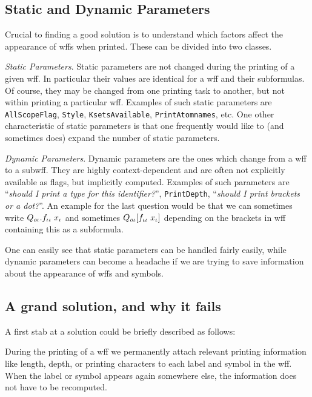 \subsection{Static and Dynamic Parameters}
Crucial to finding a good solution is to understand which factors affect
the appearance of wffs when printed.  These can be divided into two
classes.
\begin{description}
\item {\it Static Parameters}.  Static parameters are not changed during the printing
of a given wff.  In particular their values are identical for a wff
and their subformulas.  Of course, they may be changed from one printing
task to another, but not within printing a particular wff.  Examples
of such static parameters are {\tt AllScopeFlag}, {\tt Style}, {\tt KsetsAvailable},
{\tt PrintAtomnames}, etc.  One other characteristic of static parameters
is that one frequently would like to (and sometimes does) expand the
number of static parameters.

\item {\it Dynamic Parameters}.  Dynamic parameters are the ones which change from
a wff to a subwff.  They are highly context-dependent and are often
not explicitly available as flags, but implicitly computed.  Examples
of such parameters are ``{\it should I print a type for this identifier?}'',
{\tt PrintDepth}, ``{\it should I print brackets or a dot?}''.  An example
for the last question would be that we can sometimes write
$Q_{o\iota} . f_{\iota\iota} \; x_\iota$ and sometimes
$Q_{o\iota} [f_{\iota\iota} \; x_\iota]$ depending on
the brackets in wff containing this as a subformula.
\end{description}

One can easily see that static parameters can be handled fairly easily,
while dynamic parameters can become a headache if we are trying to save
information about the appearance of wffs and symbols.

\subsection{A grand solution, and why it fails}

A first stab at a solution could be briefly described as follows:

During the printing of a wff we permanently attach relevant printing
information like length, depth, or printing characters to each label and symbol
in the wff.  When the label or symbol appears again somewhere else, the
information does not have to be recomputed.


